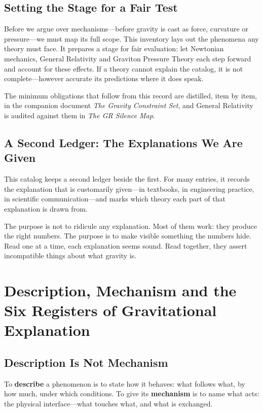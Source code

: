 \documentclass[11pt,a4paper]{article}
\begin{document}
\subsection{Setting the Stage for a Fair Test}

Before we argue over mechanisms---before gravity is cast as force, curvature or pressure---we must map its full scope. This inventory lays out the phenomena any theory must face. It prepares a stage for fair evaluation: let Newtonian mechanics, General Relativity and Graviton Pressure Theory each step forward and account for these effects. If a theory cannot explain the catalog, it is not complete---however accurate its predictions where it does speak.

The minimum obligations that follow from this record are distilled, item by item, in the companion document \emph{The Gravity Constraint Set}, and General Relativity is audited against them in \emph{The GR Silence Map}.

\subsection{A Second Ledger: The Explanations We Are Given}

This catalog keeps a second ledger beside the first. For many entries, it records the explanation that is customarily given---in textbooks, in engineering practice, in scientific communication---and marks which theory each part of that explanation is drawn from.

The purpose is not to ridicule any explanation. Most of them work: they produce the right numbers. The purpose is to make visible something the numbers hide. Read one at a time, each explanation seems sound. Read together, they assert incompatible things about what gravity is.

\section{Description, Mechanism and the Six Registers of Gravitational Explanation}

\subsection{Description Is Not Mechanism}

To \textbf{describe} a phenomenon is to state how it behaves: what follows what, by how much, under which conditions. To give its \textbf{mechanism} is to name what acts: the physical interface---what touches what, and what is exchanged.
\end{document}

